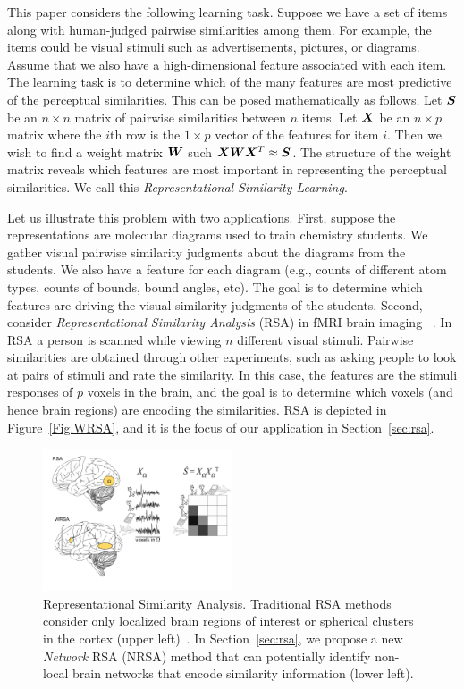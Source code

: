 This paper considers the following learning task. Suppose we have a set of items
along with human-judged pairwise similarities among them. For example, the
items could be visual stimuli such as advertisements, pictures, or diagrams.
Assume that we also have a high-dimensional feature associated with each item.
The learning task is to determine which of the many features are most predictive
of the perceptual similarities. This can be posed mathematically as follows.
Let $\boldsymbol{S}$ be an $n\times n$ matrix of pairwise similarities between $n$ items.
Let $\boldsymbol{X}$ be an $n\times p$ matrix where the $i$th row is the $1\times p$ vector
of the features for item $i$. Then we wish to find a weight matrix $\boldsymbol{W}$ such
$\boldsymbol{X}\boldsymbol{W}\boldsymbol{X}^T \approx \boldsymbol{S}$. The structure of the weight matrix reveals which
features are most important in representing the perceptual similarities. We call
this {\em Representational Similarity Learning}.

Let us illustrate this problem with two applications. First, suppose the
representations are molecular diagrams used to train chemistry students. We
gather visual pairwise similarity judgments about the diagrams from the
students. We also have a feature for each diagram (e.g., counts of different
atom types, counts of bounds, bound angles, etc). The goal is to determine
which features are driving the visual similarity judgments of the students.
Second, consider {\em Representational Similarity Analysis} (RSA) in fMRI brain
imaging ~\cite{RSA}. In RSA a person is scanned while viewing $n$ different
visual stimuli. Pairwise similarities are obtained through other experiments,
such as asking people to look at pairs of stimuli and rate the similarity. In
this case, the features are the stimuli responses of $p$ voxels in the brain,
and the goal is to determine which voxels (and hence brain regions) are encoding
the similarities. RSA is depicted in Figure~\ref{Fig.WRSA}, and it is the focus
of our application in Section~\ref{sec:rsa}.
\begin{figure}[!h]
	\centering
    \includegraphics[width=0.5\textwidth]{figures/WRSA.pdf}
    \caption{Representational Similarity Analysis. Traditional RSA methods
      consider only localized brain regions of interest or spherical clusters in
      the cortex (upper left)~\cite{RSA,searchlight}. In Section~\ref{sec:rsa},
      we propose a new {\em Network} RSA (NRSA) method that can potentially
      identify non-local brain networks that encode similarity information
      (lower left). }
    \label{Fig:WRSA}
\end{figure}

